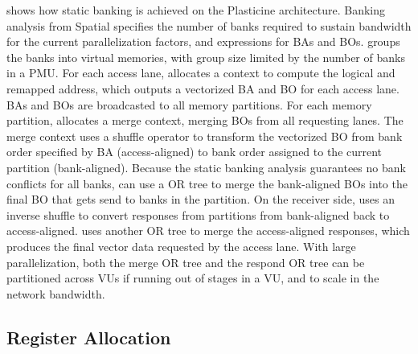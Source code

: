  shows how static banking is achieved on the Plasticine architecture.
Banking analysis from Spatial specifies the number of banks required to sustain bandwidth for the
current parallelization factors, and expressions for BAs and BOs. 
\name groups the banks into virtual memories, with group size limited by the number of banks in a PMU.
For each access lane, \name allocates a context to compute the logical and remapped address, which
outputs a vectorized BA and BO for each access lane. BAs and BOs are broadcasted to all memory partitions.
For each memory partition, \name allocates a merge context, merging BOs from all requesting lanes.
The merge context uses a shuffle operator to transform the vectorized BO from bank order specified by BA
(access-aligned) to bank order assigned to the current partition (bank-aligned).
Because the static banking analysis guarantees no bank conflicts for all banks,
\name can use a OR tree to merge the bank-aligned BOs into the final BO that gets send to
banks in the partition. On the receiver side, \name uses an inverse shuffle to convert responses from
partitions from bank-aligned back to access-aligned.
\name uses another OR tree to merge the access-aligned responses, which produces the final vector data requested
by the access lane.
With large parallelization, both the merge OR tree and the respond OR tree can be
partitioned across VUs if running out of stages in a VU, and to scale in the network bandwidth.


\subsection{Register Allocation} \label{sec:regalloc}

